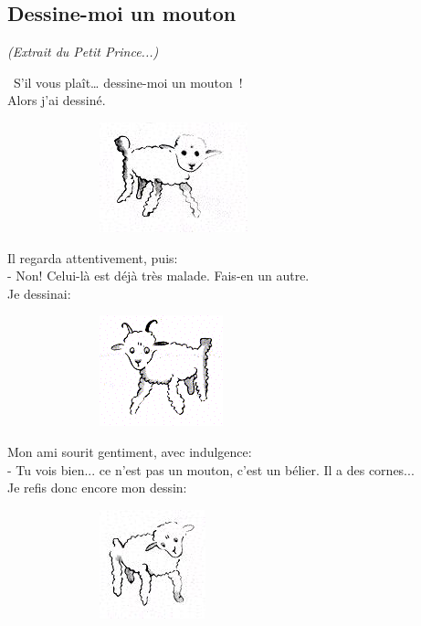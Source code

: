 \documentclass[12pt]{article}
\begin{document}
\subsection*{Dessine-moi un mouton}

\textit{(Extrait du Petit Prince...)}

\begin{multicols}{2}
  \og S'il vous plaît… dessine-moi un mouton ! \fg \\
  Alors j'ai dessiné.
  
  \begin{figure}[H]
        \centering
        \includegraphics[width=0.3\linewidth]{4x5-calcul-litteral-1/sources/dm-mouton2.png}
  \end{figure}

  Il regarda attentivement, puis: \\
  - Non! Celui-là est déjà très malade. Fais-en un autre. \\
  Je dessinai:

  \begin{figure}[H]
        \centering
        \includegraphics[width=0.3\linewidth]{4x5-calcul-litteral-1/sources/dm-mouton1.png}
  \end{figure}

  Mon ami sourit gentiment, avec indulgence: \\
  - Tu vois bien... ce n'est pas un mouton, c'est un bélier. Il a des cornes... \\
  Je refis donc encore mon dessin:

  \begin{figure}[H]
        \centering
        \includegraphics[width=0.3\linewidth]{4x5-calcul-litteral-1/sources/dm-mouton3.png}
  \end{figure}
  

\end{multicols}
\end{document}
